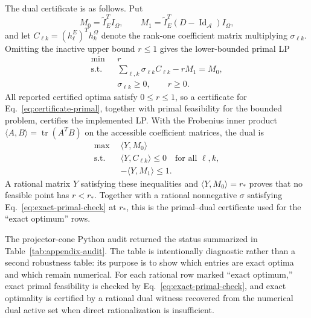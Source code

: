 \documentclass[aps,pra,twocolumn,superscriptaddress,nofootinbib]{revtex4-2}
\newcommand{\tr}{\operatorname{tr}}
\begin{document}
The dual certificate is as follows.  Put
\begin{equation}
        M_0=\widetilde I_E^TI_\Omega,\qquad
        M_1=\widetilde I_E^T(D-\operatorname{Id}_{\mathcal A})I_\Omega,
\end{equation}
and let \(C_{\ell k}=(h^E_\ell)^T h^\Omega_k\) denote the rank-one coefficient
matrix multiplying \(\sigma_{\ell k}\).  Omitting the inactive upper bound
\(r\le1\) gives the lower-bounded primal LP
\begin{equation}
        \begin{aligned}
        \min\ & r\\
        \text{s.t.}\quad&
        \sum_{\ell,k}\sigma_{\ell k}C_{\ell k}-rM_1=M_0,\\
        &\sigma_{\ell k}\ge0,\qquad r\ge0 .
        \end{aligned}
        \label{eq:certificate-primal}
\end{equation}
All reported certified optima satisfy \(0\le r\le1\), so a certificate for
Eq.~\eqref{eq:certificate-primal}, together with primal feasibility for the
bounded problem, certifies the implemented LP.  With the Frobenius inner product
\(\langle A,B\rangle=\tr(A^TB)\) on the accessible coefficient matrices, the dual is
\begin{equation}
        \begin{aligned}
        \max\ & \langle Y,M_0\rangle\\
        \text{s.t.}\quad&
        \langle Y,C_{\ell k}\rangle\le0
        \quad\text{for all }\ell,k,\\
        &-\langle Y,M_1\rangle\le1 .
        \end{aligned}
        \label{eq:certificate-dual}
\end{equation}
A rational matrix \(Y\) satisfying these inequalities and
\(\langle Y,M_0\rangle=r_*\) proves that no feasible point has \(r<r_*\).
Together with a rational nonnegative \(\sigma\) satisfying
Eq.~\eqref{eq:exact-primal-check} at \(r_*\), this is the primal--dual
certificate used for the ``exact optimum'' rows.

The projector-cone Python audit returned the status summarized in Table~\ref{tab:appendix-audit}.  The table is intentionally diagnostic rather than a second robustness table: its purpose is to show which entries are exact optima and which remain numerical.  For each rational row marked ``exact optimum,'' exact primal feasibility is checked by Eq.~\eqref{eq:exact-primal-check}, and exact optimality is certified by a rational dual witness recovered from the numerical dual active set when direct rationalization is insufficient.
\end{document}
